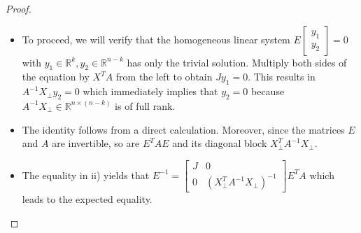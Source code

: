 \documentclass[10pt,a4paper]{amsart}
\begin{document}
			\begin{proof}
				\begin{itemize}\item[i)]
					To proceed, we will verify that the homogeneous linear system $E \left[\begin{smallmatrix}
							y_1 \\ 
							y_2
						\end{smallmatrix}\right]=0$ %
						with $y_1\in\mathbb{R}^{k}, y_2\in\mathbb{R}^{n-k}$ has only the trivial solution. %
					Multiply both sides of the equation by $X^{T}A$ from the left to obtain %
						$Jy_1 = 0$. This results in %
					$A^{-1}X_{\perp}y_2 = 0$ which immediately implies that $y_2=0$ %
					because $A^{-1}X_{\perp}\in\mathbb{R}^{n\times (n-k)}$ is of full rank.%
					\item[ii)] The identity follows from a direct calculation. %
					Moreover, since the matrices $E$ and $A$ are invertible, so are $E^{T}AE$ and its diagonal block $X_{\perp}^{T}A^{-1}X_{\perp}.$
					\item[iii)] The equality in ii) yields that 
						$	E^{-1} = \left[\begin{smallmatrix}
							J & 0\\ 
							0 & (X_{\perp}^{T}A^{-1}X_{\perp})^{-1}
						\end{smallmatrix}\right] E^TA
						$
						which leads to the expected equality. %

\end{itemize}
\end{proof}
\end{document}
